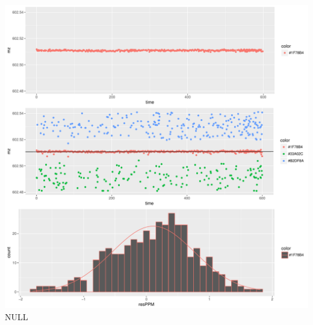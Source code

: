 \documentclass[]{article}
\begin{document}
\includegraphics{Supplementary_document_files/figure-latex/filter.lm.602-1.pdf}
NULL
\end{document}
